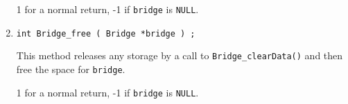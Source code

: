\begin{enumerate}
\par {}
1 for a normal return, -1 if \texttt{bridge} is \texttt{NULL}.
\item
\begin{verbatim}
int Bridge_free ( Bridge *bridge ) ;
\end{verbatim}
This method releases any storage by a call to
{\tt Bridge\_clearData()} and then free the space for {\tt bridge}.
\par {}
1 for a normal return, -1 if \texttt{bridge} is \texttt{NULL}.
\end{enumerate}
\par
